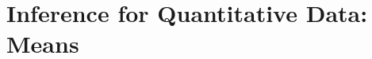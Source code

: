 \documentclass[../stats.tex]{subfiles}
\begin{document}
\chapter{Inference for Quantitative Data: Means}
\end{document}

